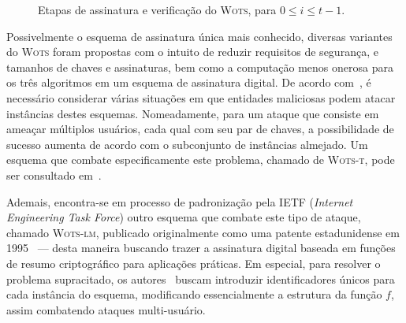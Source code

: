 \documentclass[12pt]{report}
\begin{document}
\begin{figure}[ht]
  \centering
  \caption{Etapas de assinatura e verificação do \textsc{Wots},
    para $0 \leq i \leq t - 1$.}
  \label{fig:5}
\end{figure}

Possivelmente o esquema de assinatura única mais conhecido, diversas variantes do
\textsc{Wots} foram propostas com o intuito de reduzir requisitos de segurança,
e tamanhos de chaves e assinaturas, bem como a computação menos onerosa para os
três algoritmos em um esquema de assinatura digital. De acordo
com~\cite{LafrancePhilip2017}, é necessário considerar várias situações em que
entidades maliciosas podem atacar instâncias destes esquemas. Nomeadamente, para
um ataque que consiste em ameaçar múltiplos usuários, cada qual com seu par de
chaves, a possibilidade de sucesso aumenta de acordo com o subconjunto de
instâncias almejado. Um esquema que combate especificamente este problema,
chamado de \textsc{Wots-t}, pode ser consultado em~\cite{Hulsing:2016:MMA:3081852.3081871}.

Ademais, encontra-se em processo de padronização pela IETF (\emph{Internet Engineering Task
Force}) outro esquema que combate este tipo de ataque, chamado \textsc{Wots-lm}, publicado
originalmente como uma patente estadunidense em 1995~\cite{lm-patent} --- desta maneira
buscando trazer a assinatura digital baseada em funções de resumo criptográfico
para aplicações práticas. Em especial, para resolver o problema supracitado, os
autores~\cite{mcgrew-hash-sigs-08} buscam introduzir identificadores únicos para cada instância do
esquema, modificando essencialmente a estrutura da função $f$, assim combatendo
ataques multi-usuário.
\end{document}

